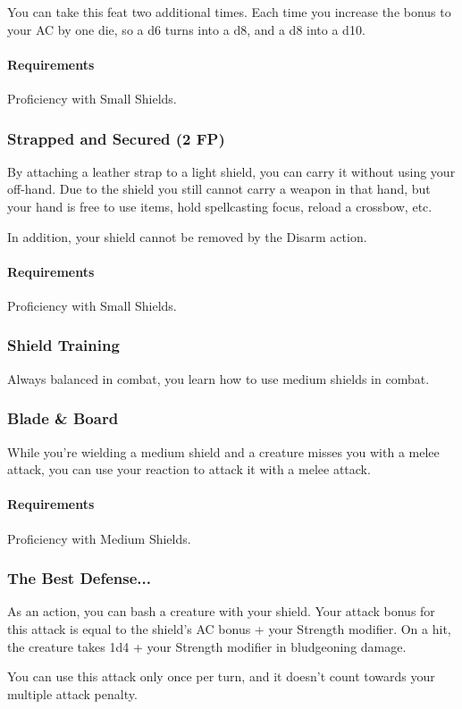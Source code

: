     You can take this feat two additional times.
    Each time you increase the bonus to your AC by one die, so a d6 turns into a d8, and a d8 into a d10.
    \paragraph{Requirements} Proficiency with Small Shields.
\subsubsection{Strapped and Secured (2 FP)} \label{feat::strappedandsecured}
    By attaching a leather strap to a light shield, you can carry it without using your off-hand.
    Due to the shield you still cannot carry a weapon in that hand, but your hand is free to use items, hold spellcasting focus, reload a crossbow, etc.

    In addition, your shield cannot be removed by the Disarm action.
    \paragraph{Requirements} Proficiency with Small Shields.
\subsubsection{Shield Training} \label{feat::shieldtraining}
    Always balanced in combat, you learn how to use medium shields in combat.
\subsubsection{Blade \& Board} \label{feat::bladeandboard}
    While you're wielding a medium shield and a creature misses you with a melee attack, you can use your reaction to attack it with a melee attack.
    \paragraph{Requirements} Proficiency with Medium Shields.
\subsubsection{The Best Defense...} \label{feat::thebestdefense}
    As an action, you can bash a creature with your shield.
    Your attack bonus for this attack is equal to the shield's AC bonus + your Strength modifier.
    On a hit, the creature takes 1d4 + your Strength modifier in bludgeoning damage.

    You can use this attack only once per turn, and it doesn't count towards your multiple attack penalty.

